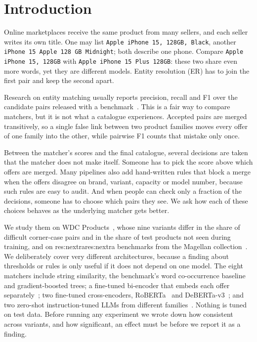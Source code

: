 \documentclass[conference]{IEEEtran}
\newcommand{\R}[1]{\ifcsname res:#1\endcsname\csname res:#1\endcsname\else{\color{red}\textbf{[#1]}}\fi}
\begin{document}
\section{Introduction}

Online marketplaces receive the same product from many sellers, and each seller writes its own title.
One may list \texttt{Apple iPhone 15, 128GB, Black}, another \texttt{iPhone 15 Apple 128 GB Midnight};
both describe one phone. Compare \texttt{Apple iPhone 15, 128GB} with \texttt{Apple iPhone 15 Plus
128GB}: these two share even more words, yet they are different models. Entity resolution (ER) has to join the
first pair and keep the second apart.

Research on entity matching usually reports precision, recall and F1 over the candidate pairs released
with a benchmark~\cite{peeters2024wdc,li2020ditto}. This is a fair way to compare matchers, but it is not
what a catalogue experiences. Accepted pairs are merged transitively, so a single false link between two
product families moves every offer of one family into the other, while pairwise F1 counts that mistake
only once.

Between the matcher's scores and the final catalogue, several decisions are taken that the matcher does
not make itself. Someone has to pick the score above which offers are merged. Many pipelines also add
hand-written rules that block a merge when the offers disagree on brand, variant, capacity or model
number, because such rules are easy to audit. And when people can check only a fraction of the
decisions, someone has to choose which pairs they see. We ask how each of these choices behaves as the
underlying matcher gets better.

We study them on WDC Products~\cite{peeters2024wdc}, whose nine variants differ in the share of
difficult corner-case pairs and in the share of test products not seen during training, and on
\R{nextra} benchmarks from the Magellan collection~\cite{konda2016magellan,mudgal2018deepmatcher}. We
deliberately cover very different architectures, because a finding about thresholds or rules is only
useful if it does not depend on one model. The eight matchers include string similarity, the benchmark's
word co-occurrence baseline and gradient-boosted trees; a fine-tuned bi-encoder that embeds each offer
separately~\cite{reimers2019sbert,song2020mpnet}; two fine-tuned cross-encoders, RoBERTa~\cite{liu2019roberta}
and DeBERTa-v3~\cite{he2023debertav3}; and two zero-shot instruction-tuned LLMs from different
families~\cite{qwen2025,abdin2024phi3}. Nothing is tuned on test data. Before running any experiment we
wrote down how consistent across variants, and how significant, an effect must be before we report it as
a finding.
\end{document}
